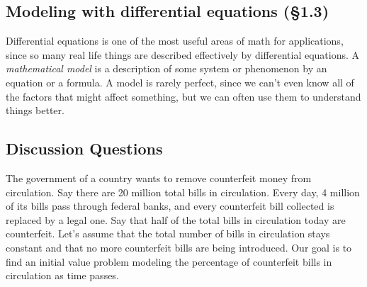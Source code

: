 \documentclass[12pt]{amsart}
\numberwithin{equation}{section}
\theoremstyle{plain} %
\theoremstyle{definition}
\theoremstyle{remark}
\begin{document}
\subsection*{Modeling with differential equations (\S1.3)}

Differential equations is one of the most useful areas of math for applications, since so many real life things are described effectively by differential equations. A \emph{mathematical model} is a description of some system or phenomenon by an equation or a formula. A model is rarely perfect, since we can't even know all of the factors that might affect something, but we can often use them to understand things better.








\subsection*{Discussion Questions}

The government of a country wants to remove counterfeit money from circulation. Say there are 20 million total bills in circulation. Every day, 4 million of its bills pass through federal banks, and every counterfeit bill collected is replaced by a legal one. Say that half of the total bills in circulation today are counterfeit. Let's assume that the total number of bills in circulation stays constant and that no more counterfeit bills are being introduced. Our goal is to find an initial value problem modeling the percentage of counterfeit bills in circulation as time passes. 
\end{document}
